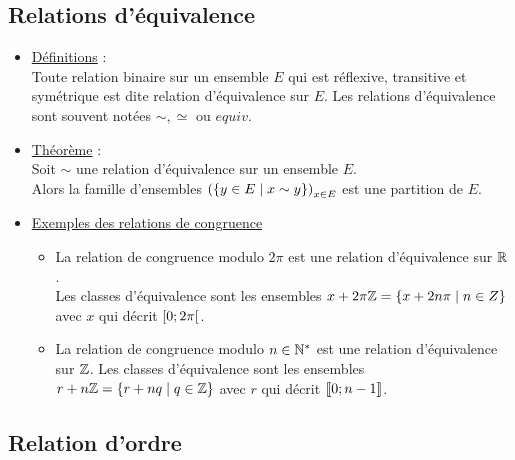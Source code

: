 \subsection{Relations d'équivalence}
\begin{defprop}
    \begin{itemize}
        \item \underline{Définitions} : \\
            Toute relation binaire sur un ensemble \(E\) qui est réflexive, transitive et symétrique est dite relation d’équivalence sur \(E\). Les relations d’équivalence sont souvent notées \(\sim,\simeq \) ou \(equiv\).
        \item \underline{Théorème} : \\
        Soit \(\sim\) une relation d’équivalence sur un ensemble \(E\).\\
        Alors la famille d’ensembles \(\left(\left\lbrace y \in E \;\middle|\; x \sim y\right\rbrace\right)_{x\in E}\) est une partition de \(E\).
        \item \underline{Exemples des relations de congruence}
        \begin{itemize}
            \item La relation de congruence modulo \(2\pi\) est une relation d’équivalence sur \(\mathbb{R}\).\\
                Les classes d’équivalence sont les ensembles \(x + 2\pi\mathbb{Z} = \left\lbrace x + 2n\pi \;\middle|\; n \in Z\right\rbrace\) avec \(x\) qui décrit \(\left[0;2\pi\right[\).
            \item La relation de congruence modulo \(n \in \mathbb{N}^*\) est une relation d’équivalence sur \( \mathbb{Z}\).
                Les classes d’équivalence sont les ensembles \(r + n\mathbb{Z} = \left\lbrace r + nq \;\middle|\; q \in \mathbb{Z}\right\rbrace\) avec \(r\) qui décrit \(\left\llbracket0;n-1\right\rrbracket\).
        \end{itemize}
    \end{itemize}
\end{defprop}

\subsection{Relation d'ordre}

